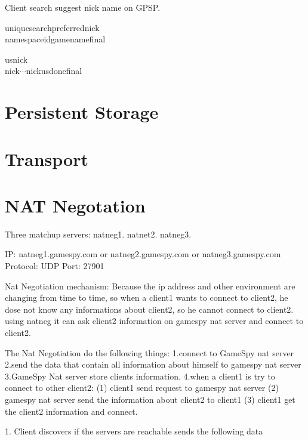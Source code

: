 \documentclass[oneside,titlepage,a4paper]{Definition/retrospy} %
\begin{document}
Client search suggest nick name on GPSP.

\ClientRequest
\begin{mybox}
	\tbs uniquesearch\tbs\tbs preferrednick\tbs<unique nick name>\\
	\tbs namespaceid\tbs<namespace id>\tbs gamename\tbs<game name>\tbs final\tbs
\end{mybox}
\ServerResponse
\begin{mybox}
	\tbs us\tbs<number of suggest nick>\tbs nick\tbs <nick name1>\\
	\tbs nick\tbs<nick name2>\tbs $\cdots$\tbs nick\tbs <nick name n>\tbs usdone\tbs final\tbs
\end{mybox}










\part{Persistent Storage}
\part{Transport}
\part{NAT Negotation}
Three matchup servers: natneg1. natnet2. natneg3.

IP: natneg1.gamespy.com or natneg2.gamespy.com or natneg3.gamespy.com
Protocol: UDP
Port: 27901

Nat Negotiation mechanism:
Because the ip address and other environment are changing from time to time, so when a client1 wants to connect
to client2, he dose not know any informations about client2, so he cannot connect to client2. using natneg it can ask client2 information on gamespy nat server and connect to client2.

The Nat Negotiation do the following things:
1.connect to GameSpy nat server
2.send the data that contain all information about himself to gamespy nat server
3.GameSpy Nat server store clients information.
4.when a client1 is try to connect to other client2:
(1) client1 send request to gamespy nat server
(2) gamespy nat server send the information about client2 to client1
(3) client1 get the client2 information and connect.

1. Client discovers if the servers are reachable
sends the following data
\end{document}
